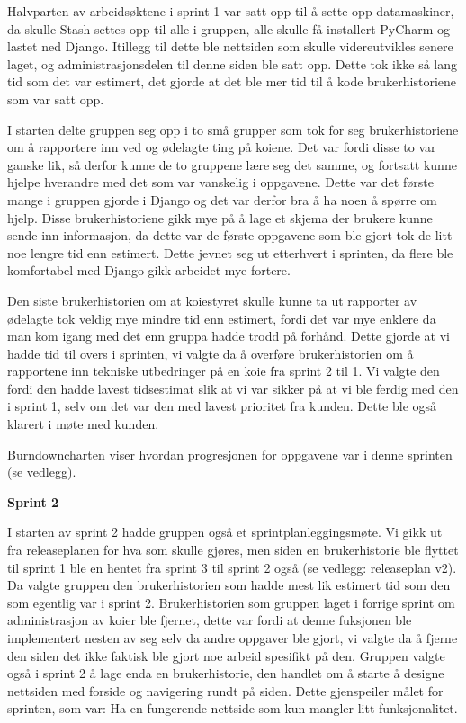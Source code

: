 \documentclass[12pt,a4paper,norsk]{article}
\begin{document}
Halvparten av arbeidsøktene i sprint 1 var satt opp til å sette opp datamaskiner, da skulle Stash settes opp til alle i gruppen, alle skulle få installert PyCharm og lastet ned Django. Itillegg til dette ble nettsiden som skulle videreutvikles senere laget, og administrasjonsdelen til denne siden ble satt opp. Dette tok ikke så lang tid som det var estimert, det gjorde at det ble mer tid til å kode brukerhistoriene som var satt opp. 

I starten delte gruppen seg opp i to små grupper som tok for seg brukerhistoriene om å rapportere inn ved og ødelagte ting på koiene. Det var fordi disse to var ganske lik, så derfor kunne de to gruppene lære seg det samme, og fortsatt kunne hjelpe hverandre med det som var vanskelig i oppgavene. Dette var det første mange i gruppen gjorde i Django og det var derfor bra å ha noen å spørre om hjelp. Disse brukerhistoriene gikk mye på å lage et skjema der brukere kunne sende inn informasjon, da dette var de første oppgavene som ble gjort tok de litt noe lengre tid enn estimert. Dette jevnet seg ut etterhvert i sprinten, da flere ble komfortabel med Django gikk arbeidet mye fortere. 

Den siste brukerhistorien om at koiestyret skulle kunne ta ut rapporter av ødelagte tok veldig mye mindre tid enn estimert, fordi det var mye enklere da man kom igang med det enn gruppa hadde trodd på forhånd. Dette gjorde at vi hadde tid til overs i sprinten, vi valgte da å overføre brukerhistorien om å rapportene inn tekniske utbedringer på en koie fra sprint 2 til 1.  Vi valgte den fordi den hadde lavest tidsestimat slik at vi var sikker på at vi ble ferdig med den i sprint 1, selv om det var den med lavest prioritet fra kunden. Dette ble også klarert i møte med kunden. 

Burndowncharten viser hvordan progresjonen for oppgavene var i denne sprinten (se vedlegg).

\bigskip \noindent \textbf{Sprint 2}
\par I starten av sprint 2 hadde gruppen også et sprintplanleggingsmøte. Vi gikk ut fra releaseplanen for hva som skulle gjøres, men siden en brukerhistorie ble flyttet til sprint 1 ble en hentet fra sprint 3 til sprint 2 også (se vedlegg: releaseplan v2). Da valgte gruppen den brukerhistorien som hadde mest lik estimert tid som den som egentlig var i sprint 2. Brukerhistorien som gruppen laget i forrige sprint om administrasjon av koier ble fjernet, dette var fordi at denne fuksjonen ble implementert nesten av seg selv da andre oppgaver ble gjort, vi valgte da å fjerne den siden det ikke faktisk ble gjort noe arbeid spesifikt på den. Gruppen valgte også i sprint 2 å lage enda en brukerhistorie, den handlet om å starte å designe nettsiden med forside og navigering rundt på siden. Dette gjenspeiler målet for sprinten, som var: Ha en fungerende nettside som kun mangler litt funksjonalitet.
\end{document}

